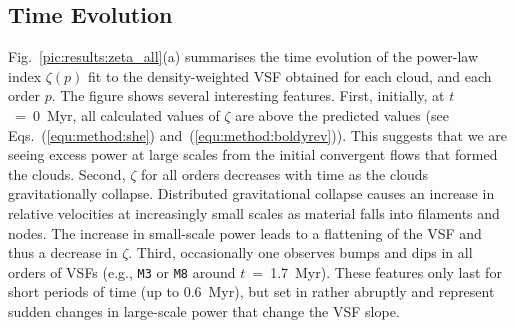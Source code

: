 \subsection{Time Evolution}\label{results:normal}

Fig.~\ref{pic:results:zeta_all}(a) summarises the time evolution of the power-law index $\zeta(p)$ fit to the density-weighted VSF obtained for each cloud, and each order $p$.
The figure shows several interesting features.
First, initially, at $t$~=~0~Myr, all calculated values of $\zeta$ are above the predicted values (see Eqs.~(\ref{equ:method:she}) and~(\ref{equ:method:boldyrev})).
This suggests that we are seeing excess power at large scales from the initial convergent flows that formed the clouds.
Second, $\zeta$ for all orders decreases with time as the clouds gravitationally collapse.
Distributed gravitational collapse causes an increase in relative velocities at increasingly small scales as material falls into filaments and nodes.  The increase in small-scale power leads to a flattening of the VSF and thus a decrease in $\zeta$.
Third, occasionally one observes bumps and dips in all orders of VSFs (e.g., \texttt{M3} or \texttt{M8} around $t$~=~1.7~Myr). 
These features only last for short periods of time (up to 0.6~Myr), but set in rather abruptly and represent sudden changes in large-scale power that change the VSF slope. 

